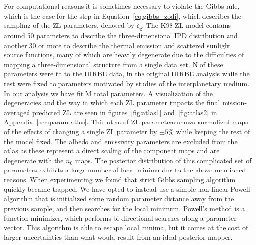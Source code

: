 \documentclass[twocolumn]{aa}
\begin{document}
For computational reasons it is sometimes necessary to violate the Gibbs rule,
which is the case for the step in Equation~\ref{eq:gibbs_zodi}, which describes
the sampling of the ZL parameters, denoted by $\zeta_\mathrm{z}$. The K98 ZL 
model contains around 50 parameters to describe the three-dimensional IPD 
distribution and another 30 or more to describe the thermal emission and 
scattered sunlight source functions, many of which are heavily degenerate
due to the difficulties of mapping a three-dimensional structure from a single
data set. N of these parameters were fit to the DIRBE data, in the original DIRBE analysis while the rest were fixed to parameters motivated by studies of the interplanetary medium. In our analysis we have fit M total parameters. A visualization of the degeneracies and the way in which each ZL parameter impacts the final mission-averaged predicted ZL are seen in figures~\ref{fig:atlas1} and~\ref{fig:atlas2} in Appendix~\ref{sec:param-atlas}. This atlas of ZL parameters shows normalized maps of the effects of changing a single ZL parameter by $\pm 5\%$ while keeping the rest of the model fixed. The albedo and emissivity parameters are excluded from the atlas as these represent a direct scaling of the component maps and are degenerate with the $n_0$ maps.
The posterior distribution of this complicated set of parameters exhibits a large number of local minima due to the above mentioned reasons. When experimenting we found that strict Gibbs sampling algorithm quickly became trapped. We have opted to instead 
use a simple non-linear Powell algorithm that is initialized some random parameter distance away from the previous sample, and then searches for the local minimum. Powell's method is a function minimizer, which performs bi-directional searches along a parameter vector. This algorithm is able to escape local minima, but it comes at the cost of larger
uncertainties than what would result from an ideal posterior mapper.
\end{document}
